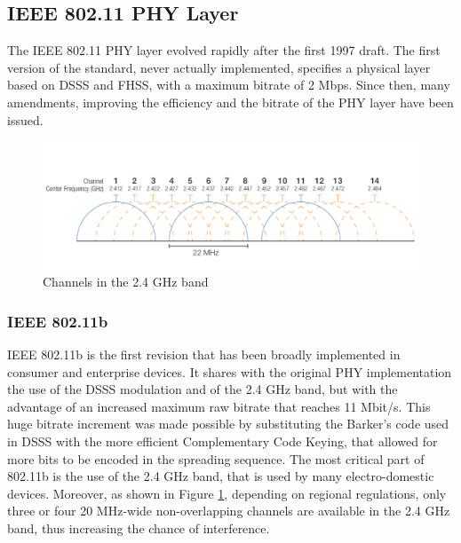 
\subsection{IEEE 802.11 PHY Layer} \label{sec:wifi-phy}

The IEEE 802.11 PHY layer evolved rapidly after the first 1997 draft. The first version of the standard, never actually implemented, specifies a physical layer based on \gls{DSSS} and \gls{FHSS}, with a maximum bitrate of 2 Mbps. Since then, many amendments, improving the efficiency and the bitrate of the PHY layer have been issued. 

\begin{figure}[h]
    \centering
    \includegraphics[width=1\textwidth]{images/wifi-channels-24.png}
    \caption{Channels in the 2.4 GHz band \cite{appinwififolder}}
    \label{fig:wifi-channels-24}
\end{figure}


\subsubsection{IEEE 802.11b}

IEEE 802.11b is the first revision that has been broadly implemented in consumer and enterprise devices. It shares with the original PHY implementation the use of the \gls{DSSS} modulation and of the 2.4 GHz band, but with the advantage of an increased maximum raw bitrate that reaches 11 Mbit/s. This huge bitrate increment was made possible by substituting the Barker's code used in \gls{DSSS} with the more efficient Complementary Code Keying, that allowed for more bits to be encoded in the spreading sequence. The most critical part of 802.11b is the use of the 2.4 GHz band, that is used by many electro-domestic devices. Moreover, as shown in Figure \ref{fig:wifi-channels-24}, depending on regional regulations, only three or four 20 MHz-wide non-overlapping channels are available in the 2.4 GHz band, thus increasing the chance of interference.

